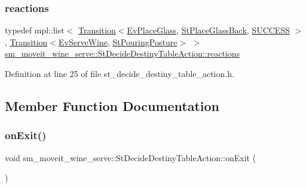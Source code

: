 \subsubsection{\texorpdfstring{reactions}{reactions}}
{\footnotesize\ttfamily typedef mpl\+::list$<$ \hyperlink{classsmacc_1_1Transition}{Transition}$<$\hyperlink{structsm__moveit__wine__serve_1_1EvPlaceGlass}{Ev\+Place\+Glass}, \hyperlink{structsm__moveit__wine__serve_1_1StPlaceGlassBack}{St\+Place\+Glass\+Back}, \hyperlink{structsmacc_1_1default__transition__tags_1_1SUCCESS}{S\+U\+C\+C\+E\+SS} $>$, \hyperlink{classsmacc_1_1Transition}{Transition}$<$\hyperlink{structsm__moveit__wine__serve_1_1EvServeWine}{Ev\+Serve\+Wine}, \hyperlink{structsm__moveit__wine__serve_1_1StPouringPosture}{St\+Pouring\+Posture}$>$ $>$ \hyperlink{structsm__moveit__wine__serve_1_1StDecideDestinyTableAction_a1b9c9f81508614c86da1ee78225b2029}{sm\+\_\+moveit\+\_\+wine\+\_\+serve\+::\+St\+Decide\+Destiny\+Table\+Action\+::reactions}}



Definition at line 25 of file st\+\_\+decide\+\_\+destiny\+\_\+table\+\_\+action.\+h.



\subsection{Member Function Documentation}
\mbox{\label{structsm__moveit__wine__serve_1_1StDecideDestinyTableAction_a191974c827cd510d432c5529b333d9da}} 
\subsubsection{\texorpdfstring{on\+Exit()}{onExit()}}
{\footnotesize\ttfamily void sm\+\_\+moveit\+\_\+wine\+\_\+serve\+::\+St\+Decide\+Destiny\+Table\+Action\+::on\+Exit (\begin{DoxyParamCaption}\item[{\hyperlink{structsmacc_1_1default__transition__tags_1_1SUCCESS}{S\+U\+C\+C\+E\+SS}}]{ }\end{DoxyParamCaption})\hspace{0.3cm}{\ttfamily [inline]}}



